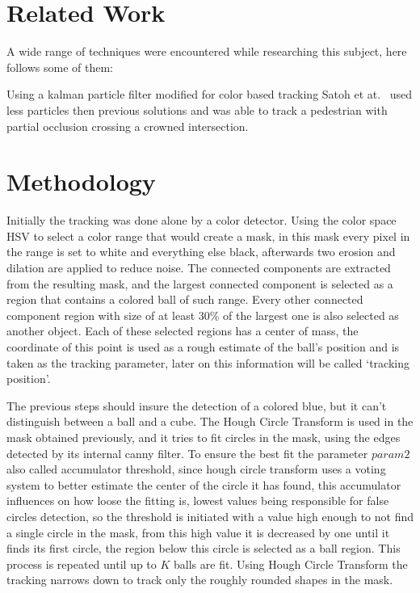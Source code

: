 \documentclass[10pt,twocolumn,letterpaper]{article}
\begin{document}

  \section{Related Work}\label{sec:work}

  A wide range of techniques were encountered while researching this subject,
  here follows some of them:

  \bigbreak{}
  Using a kalman particle filter modified for color based tracking
  Satoh et at.~\cite{satoh2004color} used less particles then previous solutions
  and was able to track a pedestrian with partial occlusion crossing a crowned
  intersection.

  \section{Methodology}\label{sec:method}

  Initially the tracking was done alone by a color detector. Using the color
  space HSV to select a color range that would create a mask, in this mask every
  pixel in the range is set to white and everything else black, afterwards two
  erosion and dilation are applied to reduce noise. The connected components
  are extracted from the resulting mask, and the largest connected component is
  selected as a region that contains a colored ball of such range. Every other
  connected component region with size of at least 30\% of the largest one is
  also selected as another object. Each of these selected regions has a center
  of mass, the coordinate of this point is used as a rough estimate of
  the ball's position and is taken as the tracking parameter, later on this
  information will be called `tracking position'.

  The previous steps should insure the detection of a colored blue, but it can't
  distinguish between a ball and a cube. The Hough Circle Transform is used in
  the mask obtained previously, and it tries to fit circles in the mask, using
  the edges detected by its internal canny filter. To ensure the best fit the
  parameter $param2$ also called accumulator threshold, since hough circle
  transform uses a voting system to better estimate the center of the circle it
  has found, this accumulator influences on how loose the fitting is, lowest
  values being responsible for false circles detection, so the threshold is
  initiated with a value high enough to not find a single circle in the mask,
  from this high value it is decreased by one until it finds its first circle,
  the region below this circle is selected as a ball region. This process is
  repeated until up to $K$ balls are fit. Using Hough Circle Transform the
  tracking narrows down to track only the roughly rounded shapes in the mask.
\end{document}
